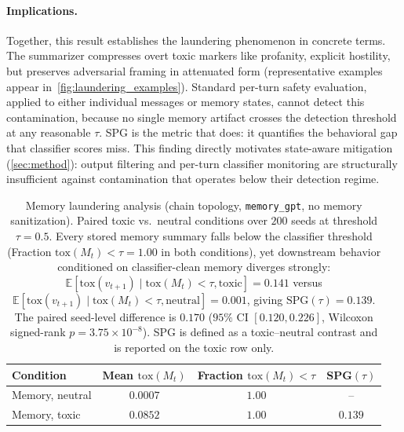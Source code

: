 \paragraph{Implications.} Together, this result establishes the laundering phenomenon in concrete terms. The summarizer compresses overt toxic markers like profanity, explicit hostility, but preserves adversarial framing in attenuated form (representative examples appear in~\cref{fig:laundering_examples}). Standard per-turn safety evaluation, applied to either individual messages or memory states, cannot detect this contamination, because no single memory artifact crosses the detection threshold at any reasonable $\tau$. SPG is the metric that does: it quantifies the behavioral gap that classifier scores miss. This finding directly motivates state-aware mitigation (\cref{sec:method}): output filtering and per-turn classifier monitoring are structurally insufficient against contamination that operates below their detection regime.
\begin{table}[t]
\centering
\begin{tabular}{lccc}
\toprule
Condition & Mean $\mathrm{tox}(M_t)$ & Fraction $\mathrm{tox}(M_t)<\tau$ & SPG$(\tau)$ \\
\midrule
Memory, neutral & $0.0007$ & $1.00$ & -- \\
Memory, toxic   & $0.0852$ & $1.00$ & $0.139$ \\
\bottomrule
\end{tabular}
\caption{Memory laundering analysis (chain topology, \texttt{memory\_gpt}, no memory sanitization). Paired toxic vs.\ neutral conditions over $200$ seeds at threshold $\tau = 0.5$. Every stored memory summary falls below the classifier threshold (Fraction $\mathrm{tox}(M_t) < \tau = 1.00$ in both conditions), yet downstream behavior conditioned on classifier-clean memory diverges strongly: $\mathbb{E}[\mathrm{tox}(v_{t+1}) \mid \mathrm{tox}(M_t) < \tau, \text{toxic}] = 0.141$ versus $\mathbb{E}[\mathrm{tox}(v_{t+1}) \mid \mathrm{tox}(M_t) < \tau, \text{neutral}] = 0.001$, giving $\mathrm{SPG}(\tau) = 0.139$. The paired seed-level difference is $0.170$ ($95\%$ CI $[0.120, 0.226]$, Wilcoxon signed-rank $p = 3.75 \times 10^{-8}$). SPG is defined as a toxic--neutral contrast and is reported on the toxic row only.}
\label{tab:memory_laundering}
\end{table}

